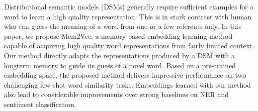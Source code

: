 Distributional semantic models (DSMs) generally require sufficient examples for a word to learn a high quality representation. This is in stark contrast with human who can guess the meaning of a word from one or a few referents only. In this paper, we propose Mem2Vec, a memory based embedding learning method capable of acquiring high quality word representations from fairly limited context. Our method directly adapts the representations produced by a DSM with a longterm memory to guide its guess of a novel word. Based on a pre-trained embedding space, the proposed method delivers impressive performance on two challenging few-shot word similarity tasks. Embeddings learned with our method also lead to considerable improvements over strong baselines on NER and sentiment classification.
